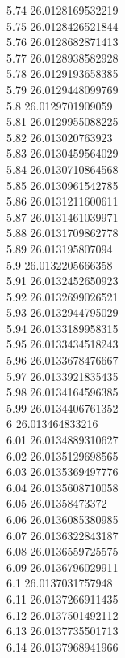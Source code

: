 {5.74	26.0128169532219\\
5.75	26.0128426521844\\
5.76	26.0128682871413\\
5.77	26.0128938582928\\
5.78	26.0129193658385\\
5.79	26.0129448099769\\
5.8	26.0129701909059\\
5.81	26.0129955088225\\
5.82	26.013020763923\\
5.83	26.0130459564029\\
5.84	26.0130710864568\\
5.85	26.0130961542785\\
5.86	26.0131211600611\\
5.87	26.0131461039971\\
5.88	26.0131709862778\\
5.89	26.013195807094\\
5.9	26.0132205666358\\
5.91	26.0132452650923\\
5.92	26.0132699026521\\
5.93	26.0132944795029\\
5.94	26.0133189958315\\
5.95	26.0133434518243\\
5.96	26.0133678476667\\
5.97	26.0133921835435\\
5.98	26.0134164596385\\
5.99	26.0134406761352\\
6	26.013464833216\\
6.01	26.0134889310627\\
6.02	26.0135129698565\\
6.03	26.0135369497776\\
6.04	26.0135608710058\\
6.05	26.01358473372\\
6.06	26.0136085380985\\
6.07	26.0136322843187\\
6.08	26.0136559725575\\
6.09	26.0136796029911\\
6.1	26.0137031757948\\
6.11	26.0137266911435\\
6.12	26.0137501492112\\
6.13	26.0137735501713\\
6.14	26.0137968941966\\
}
